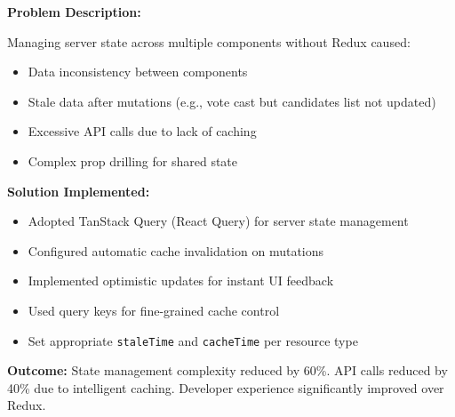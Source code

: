 \documentclass[12pt,a4paper]{article}
\begin{document}
\begin{tcolorbox}[colback=LightGold, colframe=Gold, title=\textbf{Challenge 6: Frontend State Management Complexity}, fonttitle=\bfseries]

\textbf{Problem Description:}

Managing server state across multiple components without Redux caused:
\begin{itemize}[noitemsep]
  \item Data inconsistency between components
  \item Stale data after mutations (e.g., vote cast but candidates list not updated)
  \item Excessive API calls due to lack of caching
  \item Complex prop drilling for shared state
\end{itemize}

\textbf{Solution Implemented:}
\begin{itemize}[noitemsep]
  \item Adopted TanStack Query (React Query) for server state management
  \item Configured automatic cache invalidation on mutations
  \item Implemented optimistic updates for instant UI feedback
  \item Used query keys for fine-grained cache control
  \item Set appropriate \texttt{staleTime} and \texttt{cacheTime} per resource type
\end{itemize}

\textbf{Outcome:} State management complexity reduced by 60\%. API calls reduced by 40\% due to intelligent caching. Developer experience significantly improved over Redux.
\end{tcolorbox}

\vspace{8pt}
\end{document}
